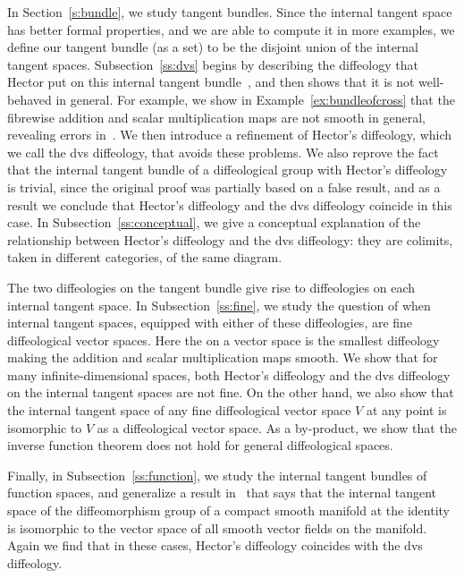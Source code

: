 \documentclass{amsart}
\newcommand{\dfn}[1]{\textbf{\boldmath{#1}}}
\theoremstyle{remark}
\begin{document}
In Section~\ref{s:bundle}, we study tangent bundles.
Since the internal tangent space has better formal properties, and
we are able to compute it in more examples,
we define our tangent bundle (as a set) to be the disjoint union
of the internal tangent spaces.
Subsection~\ref{ss:dvs} begins by describing the diffeology that Hector
put on this internal tangent bundle~\cite{He},
and then shows that it is not well-behaved in general.
For example, we show in Example~\ref{ex:bundleofcross} that the fibrewise addition and scalar
multiplication maps are not smooth in general, revealing errors in~\cite{He,HM,La}.
We then introduce a refinement of Hector's diffeology, which we call the dvs diffeology,
that avoids these problems.
%
We also reprove the fact that the internal tangent bundle of a diffeological group
with Hector's diffeology is trivial, since the original proof was partially based on a
false result, and as a result we conclude that Hector's diffeology and the dvs diffeology coincide
in this case.
In Subsection~\ref{ss:conceptual}, we give a conceptual explanation of the
relationship between Hector's diffeology and the dvs diffeology:  they are
colimits, taken in different categories, of the same diagram.

The two diffeologies on the tangent bundle give rise to
diffeologies on each internal tangent space.
In Subsection~\ref{ss:fine}, we study the question of when internal tangent spaces,
equipped with either of these diffeologies,
are fine diffeological vector spaces.  Here the \dfn{fine diffeology} on a vector
space is the smallest diffeology making the addition and scalar multiplication maps smooth.
We show that for many infinite-dimensional spaces,
both Hector's diffeology and the dvs diffeology on the internal tangent spaces are not fine.
On the other hand, we also show that the internal tangent space of any
fine diffeological vector space $V$ at any point
is isomorphic to $V$ as a diffeological vector space.
As a by-product, we show that the inverse function theorem does not hold for general diffeological spaces.

Finally, in Subsection~\ref{ss:function}, we study the internal tangent bundles of function spaces,
and generalize a result in~\cite{He,HM} that says that the internal tangent space of
the diffeomorphism group of a compact smooth manifold at the identity is isomorphic
to the vector space of all smooth vector fields on the manifold.
Again we find that in these cases, Hector's diffeology coincides with the dvs diffeology.
\end{document}
